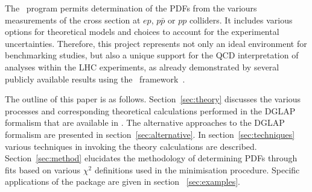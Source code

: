 %


The \fitter\ program permits determination of the PDFs from the variours measurements of the cross section at $ep$, $p\bar{p}$ or $pp$ colliders.  
 It includes various options for theoretical models and choices to account for the experimental uncertainties. Therefore, this project represents not only an ideal environment for benchmarking studies, but also a unique support for the QCD interpretation of analyses within the LHC experiments,
as already demonstrated by several publicly available results using the \fitter\ 
framework~\cite{atlas:strange,atlas:jets,atlas:hm,cms:strange,cms:jets,h1:2012kk,h1zeus:charm}.  

The outline of this paper is as follows.
%
Section~\ref{sec:theory} discusses the various processes 
and corresponding theoretical calculations performed in the DGLAP~\cite{Gribov:1972ri,Gribov:1972rt,Lipatov:1974qm,
Dokshitzer:1977sg,Altarelli:1977zs} formalism that are available in \fitter.
The alternative approaches to the DGLAP formalism are presented in section~\ref{sec:alternative}.
%
In section~\ref{sec:techniques} various techniques in invoking the theory calculations are described.
Section~\ref{sec:method} elucidates the 
methodology of determining PDFs through fits based on various
 $\chi^2$ definitions used in the
minimisation procedure. 
%
Specific applications of the package are given in
section ~\ref{sec:examples}. 
%
